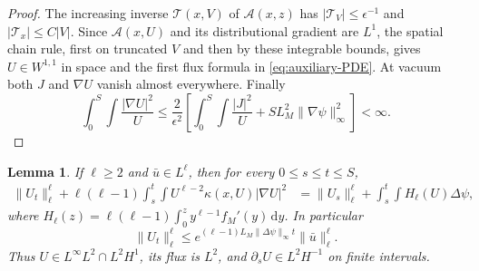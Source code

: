 \documentclass[11pt]{article}
\numberwithin{equation}{section}
\newtheorem{lemma}[theorem]{Lemma}
\theoremstyle{definition}
\theoremstyle{remark}
\newcommand{\dd}{\,\mathrm d}
\newcommand{\norm}[1]{\lVert #1\rVert}
\begin{document}
\begin{proof}
The increasing inverse $\mathcal T(x,V)$ of $\mathcal A(x,z)$ has
$|\mathcal T_V|\le\epsilon^{-1}$ and
$|\mathcal T_x|\le C|V|$.
Since $\mathcal A(x,U)$ and its distributional gradient are $L^1$,
the spatial chain rule, first on truncated $V$ and then by these integrable
bounds, gives $U\in W^{1,1}$ in space and the first flux formula in
\eqref{eq:auxiliary-PDE}. At vacuum both $J$ and $\nabla U$ vanish
almost everywhere. Finally
\begin{equation}\label{eq:Fisher}
 \int_0^S\!\int\frac{|\nabla U|^2}{U}
 \le\frac2{\epsilon^2}
       \left[\int_0^S\!\int\frac{|J|^2}{U}
                    +S L_M^2\norm{\nabla\psi}_\infty^2\right]<\infty.
\end{equation}
\end{proof}

\begin{lemma}\label{lem:renormalization}
If $\ell\ge2$ and $\bar u\in L^\ell$, then for every $0\le s\le t\le S$,
\begin{align}\label{eq:Lp-identity}
 \norm{U_t}_\ell^\ell
 +\ell(\ell-1)\int_s^t\!\int U^{\ell-2}\kappa(x,U)|\nabla U|^2
 &=\norm{U_s}_\ell^\ell+\int_s^t\!\int H_\ell(U)\Delta\psi,
\end{align}
where $H_\ell(z)=\ell(\ell-1)\int_0^z y^{\ell-1}f_M'(y)\dd y$.
In particular
\begin{equation}\label{eq:actual-Lp}
 \norm{U_t}_\ell^\ell\le
 e^{(\ell-1)L_M\norm{\Delta\psi}_\infty t}\norm{\bar u}_\ell^\ell.
\end{equation}
Thus $U\in L^\infty L^2\cap L^2H^1$, its flux is $L^2$, and
$\partial_s U\in L^2H^{-1}$ on finite intervals.
\end{lemma}
\end{document}
